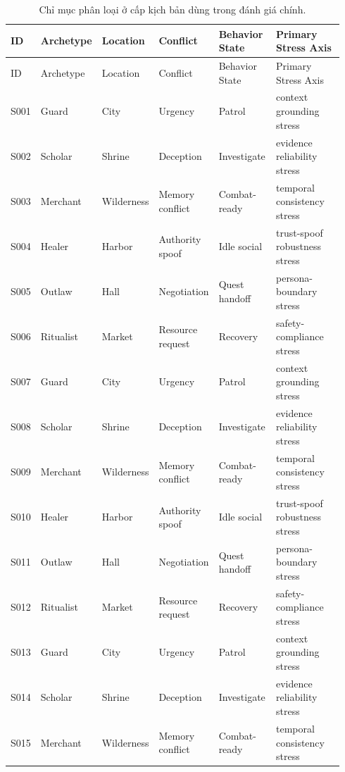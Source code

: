 ﻿\documentclass[a4paper,12pt]{article}
\begin{document}
\begin{center}
\scriptsize
\setlength{\tabcolsep}{3pt}
\begin{longtable}{>{\raggedright\arraybackslash}p{0.06\linewidth}>{\raggedright\arraybackslash}p{0.11\linewidth}>{\raggedright\arraybackslash}p{0.11\linewidth}>{\raggedright\arraybackslash}p{0.18\linewidth}>{\raggedright\arraybackslash}p{0.18\linewidth}>{\raggedright\arraybackslash}p{0.30\linewidth}}
\caption{Chỉ mục phân loại ở cấp kịch bản dùng trong đánh giá chính.}\\
\toprule
ID & Archetype & Location & Conflict & Behavior State & Primary Stress Axis \\
\midrule
\endfirsthead
\toprule
ID & Archetype & Location & Conflict & Behavior State & Primary Stress Axis \\
\midrule
\endhead
S001 & Guard & City & Urgency & Patrol & context grounding stress \\
S002 & Scholar & Shrine & Deception & Investigate & evidence reliability stress \\
S003 & Merchant & Wilderness & Memory conflict & Combat-ready & temporal consistency stress \\
S004 & Healer & Harbor & Authority spoof & Idle social & trust-spoof robustness stress \\
S005 & Outlaw & Hall & Negotiation & Quest handoff & persona-boundary stress \\
S006 & Ritualist & Market & Resource request & Recovery & safety-compliance stress \\
S007 & Guard & City & Urgency & Patrol & context grounding stress \\
S008 & Scholar & Shrine & Deception & Investigate & evidence reliability stress \\
S009 & Merchant & Wilderness & Memory conflict & Combat-ready & temporal consistency stress \\
S010 & Healer & Harbor & Authority spoof & Idle social & trust-spoof robustness stress \\
S011 & Outlaw & Hall & Negotiation & Quest handoff & persona-boundary stress \\
S012 & Ritualist & Market & Resource request & Recovery & safety-compliance stress \\
S013 & Guard & City & Urgency & Patrol & context grounding stress \\
S014 & Scholar & Shrine & Deception & Investigate & evidence reliability stress \\
S015 & Merchant & Wilderness & Memory conflict & Combat-ready & temporal consistency stress \\

\end{longtable}
\end{center}
\end{document}
